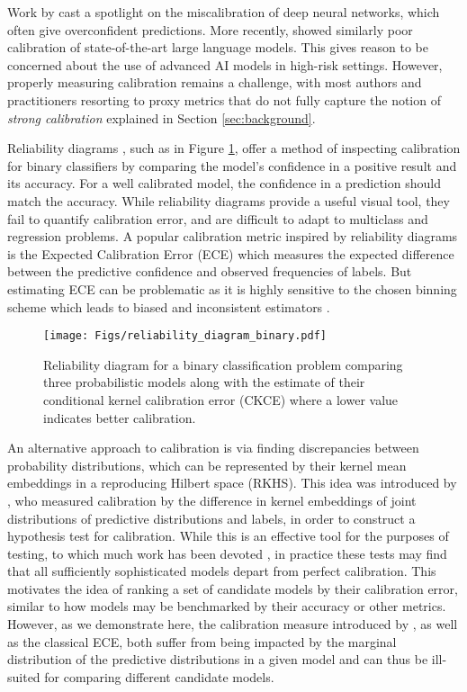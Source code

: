 \documentclass[twocolumn]{article}
\theoremstyle{definition}
\begin{document}
Work by \citet{Guo_2017} cast a spotlight on the miscalibration of deep neural networks, which often give overconfident predictions. More recently, \citet{phan2025hle} showed similarly poor calibration of state-of-the-art large language models. This gives reason to be concerned about the use of advanced AI models in high-risk settings. However, properly measuring calibration remains a challenge, with most authors and practitioners resorting to proxy metrics that do not fully capture the notion of \emph{strong calibration} explained in Section \ref{sec:background}. 

Reliability diagrams \citep{DeGroot_1983}, such as in Figure \ref{fig:reliability-diag}, offer a method of inspecting calibration for binary classifiers by comparing the model's confidence in a positive result and its accuracy. For a well calibrated model, the confidence in a prediction should match the accuracy. While reliability diagrams provide a useful visual tool, they fail to quantify calibration error, and are difficult to adapt to multiclass and regression problems. A popular calibration metric inspired by reliability diagrams is the Expected Calibration Error (ECE) \citep{naeini_2015} which measures the expected difference between the predictive confidence and observed frequencies of labels. But estimating ECE can be problematic as it is highly sensitive to the chosen binning scheme which leads to biased and inconsistent estimators \citep{Nixon_2019, vaicenavicius_2019, Widmann_2019}. 

\begin{figure}[ht]
    \centering
    \texttt{[image: Figs/reliability\_diagram\_binary.pdf]}
    \caption{Reliability diagram for a binary classification problem comparing three probabilistic models along with the estimate of their conditional kernel calibration error (CKCE) where a lower value indicates better calibration.}
    \label{fig:reliability-diag}
\end{figure}


An alternative approach to calibration is via finding discrepancies between probability distributions, which can be represented by their kernel mean embeddings in a reproducing Hilbert space (RKHS). This idea was introduced by \citet{Widmann_2021}, who measured calibration by the difference in kernel embeddings of joint distributions of predictive distributions and labels, in order to construct a hypothesis test for calibration. While this is an effective tool for the purposes of testing, to which much work has been devoted \citep{Widmann_2021, Lee_2023, Glaser_2023, Chatterjee_2024}, in practice these tests may find that all sufficiently sophisticated models depart from perfect calibration. This motivates the idea of ranking a set of candidate models by their calibration error, similar to how models may be benchmarked by their accuracy or other metrics. However, as we demonstrate here, the calibration measure introduced by \citet{Widmann_2021}, as well as the classical ECE, both suffer from being impacted by the marginal distribution of the predictive distributions in a given model and can thus be ill-suited for comparing different candidate models. 
\end{document}
